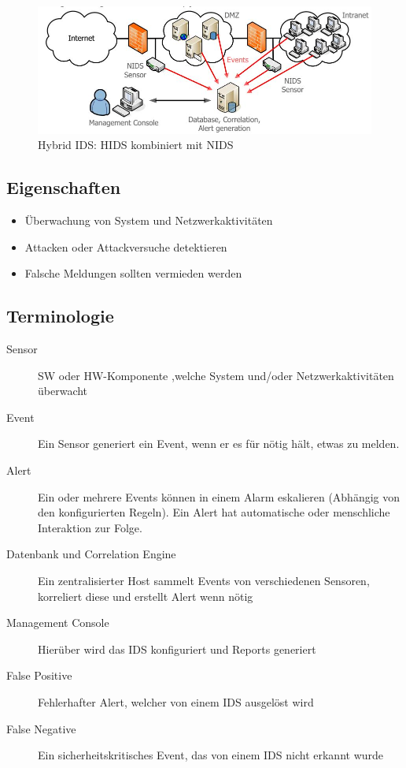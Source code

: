 \begin{figure}[h]
\centering
\includegraphics[width=0.7\linewidth]{images/hybrid_ids}
\caption{Hybrid IDS: HIDS kombiniert mit NIDS}
\label{fig:nids}
\end{figure}

\subsection{Eigenschaften}
\begin{itemize}
    \item Überwachung von System und Netzwerkaktivitäten
    \item Attacken oder Attackversuche detektieren
    \item Falsche Meldungen sollten vermieden werden
\end{itemize}

\subsection{Terminologie}
\begin{description}
	\item[Sensor] SW oder HW-Komponente ,welche System und/oder Netzwerkaktivitäten überwacht
	\item[Event] Ein Sensor generiert ein Event, wenn er es für nötig hält, etwas zu melden.
	\item[Alert] Ein oder mehrere Events können in einem Alarm eskalieren (Abhängig von den konfigurierten Regeln). Ein Alert hat automatische oder menschliche Interaktion zur Folge.
	\item[Datenbank und Correlation Engine] Ein zentralisierter Host sammelt Events von verschiedenen Sensoren, korreliert diese und erstellt Alert wenn nötig
	\item[Management Console] Hierüber wird das IDS konfiguriert und Reports generiert
	\item[False Positive] Fehlerhafter Alert, welcher von einem IDS ausgelöst wird
	\item[False Negative] Ein sicherheitskritisches Event, das von einem IDS nicht erkannt wurde
\end{description}

